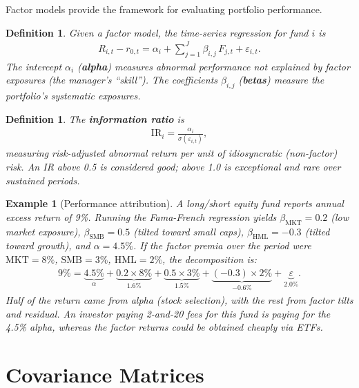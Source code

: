 \documentclass{report}
\theoremstyle{spacedplain}
\theoremstyle{spaceddefinition}
\newtheorem{definition}[theorem]{Definition}
\newtheorem{example}[theorem]{Example}
\theoremstyle{spacedremark}
\begin{document}
Factor models provide the framework for evaluating portfolio performance.

\begin{definition}
Given a factor model, the time-series regression for fund $i$ is
\begin{align}
    R_{i,t} - r_{0,t} = \alpha_i + \sum_{j=1}^J \beta_{i,j}\,F_{j,t} + \varepsilon_{i,t}.
\end{align}
The intercept $\alpha_i$ (\textbf{alpha}) measures abnormal performance not explained by factor exposures (the manager's ``skill''). The coefficients $\beta_{i,j}$ (\textbf{betas}) measure the portfolio's systematic exposures.
\end{definition}

\begin{definition}
The \textbf{information ratio} is
\begin{align}
    \text{IR}_i = \frac{\alpha_i}{\sigma(\varepsilon_{i,t})},
\end{align}
measuring risk-adjusted abnormal return per unit of idiosyncratic (non-factor) risk. An IR above 0.5 is considered good; above 1.0 is exceptional and rare over sustained periods.
\end{definition}

\begin{example}[Performance attribution]
A long/short equity fund reports annual excess return of 9\%. Running the Fama-French regression yields $\beta_{\text{MKT}} = 0.2$ (low market exposure), $\beta_{\text{SMB}} = 0.5$ (tilted toward small caps), $\beta_{\text{HML}} = -0.3$ (tilted toward growth), and $\alpha = 4.5\%$. If the factor premia over the period were $\text{MKT} = 8\%$, $\text{SMB} = 3\%$, $\text{HML} = 2\%$, the decomposition is:
\begin{align}
    9\% = \underbrace{4.5\%}_{\alpha} + \underbrace{0.2 \times 8\%}_{1.6\%} + \underbrace{0.5 \times 3\%}_{1.5\%} + \underbrace{(-0.3) \times 2\%}_{-0.6\%} + \underbrace{\varepsilon}_{2.0\%}.
\end{align}
Half of the return came from alpha (stock selection), with the rest from factor tilts and residual. An investor paying 2-and-20 fees for this fund is paying for the 4.5\% alpha, whereas the factor returns could be obtained cheaply via ETFs.
\end{example}

\section{Covariance Matrices}
 
\end{document}
